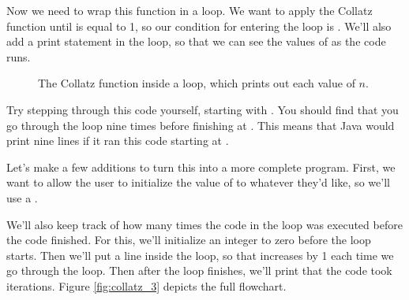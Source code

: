 Now we need to wrap this function in a loop. We want to apply the Collatz function until  is equal to 1, so our condition for entering the loop is .  We'll also add a print statement in the loop, so that we can see the values of  as the code runs.

\begin{figure}
    \centering
    \caption{The Collatz function inside a loop, which prints out each value of $n$.}
    \label{fig:collatz_2}
\end{figure}

Try stepping through this code yourself, starting with . You should find that you go through the loop nine times before finishing at . This means that Java would print nine lines if it ran this code starting at .

Let's make a few additions to turn this into a more complete program. First, we want to allow the user to initialize the value of  to whatever they'd like, so we'll use a . 

We'll also keep track of how many times the code in the loop was executed before the code finished. For this, we'll initialize an integer  to zero before the loop starts. Then we'll put a line  inside the loop, so that  increases by 1 each time we go through the loop. Then after the loop finishes, we'll print that the code took  iterations. Figure \ref{fig:collatz_3} depicts the full flowchart.

